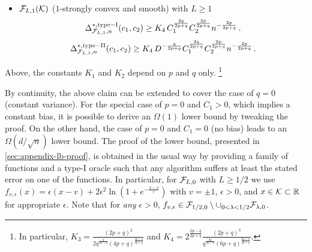 \begin{theorem}
\begin{itemize}
\item
${\mathcal{F}_{L,1}(\mathcal{K})}$ ($1$-strongly convex and smooth) with $L\ge 1$
\[
\Delta_{\F_{L,1}, n}^{*, \mathrm{type-I}}(c_1,c_2) \ge K_4 \,  C_1^{\frac{2q}{2p+q}} C_2^{\frac{2p}{2p+q}} n^{-\frac{2p}{2p+q}}\,. %
\]
\[
\Delta_{\F_{L,1}, n}^{*, \mathrm{type-II}}(c_1,c_2) \ge K_4 \,  D^{-\frac{q}{2p+q}}C_1^{\frac{2q}{2p+q}} C_2^{\frac{2p}{2p+q}} n^{-\frac{2p}{2p+q}}\,. %
\]
\end{itemize}
Above,
the constants $K_1$ and $K_2$ depend on $p$ and $q$ only.%
\footnote{
In particular,
$K_3= \frac{\left(2p+q\right)^2}{2q^{\frac{q}{2p+q}}\left(4p+q\right)^{\frac{4p+q}{2p+q}}}$
and
$K_4= 2^{\frac{2p-q}{2p+q}} \frac{(2p+q)^3}{q^{\frac{2q}{2p+q}}(6p+q)^{\frac{6p+q}{2p+q}}}$.}
\end{theorem}

By continuity, the above claim can be extended to cover the case of $q=0$ (constant variance). 
For the special case of $p=0$ and $C_1>0$, which implies a constant bias, it is possible to derive an $\Omega(1)$ lower bound by tweaking the proof. On the other hand, the case of $p=0$ and $C_1=0$ (no bias) leads to an $\Omega(d/\sqrt{n})$ lower bound. The proof of the lower bound, presented in \cref{sec:appendix-lb-proof}, is obtained in the usual way by providing a family of functions and a type-I oracle such that any algorithm suffers at least the stated error on one of the functions. In particular, for $\mathcal{F}_{L,0}$ with $L\ge 1/2$ we use
$f_{v,\epsilon}(x)=\epsilon\left( x-v\right)+2\epsilon^2 \ln\left(1+e^{-\frac{x-v}{\epsilon}}  \right)$ with $v=\pm 1$, $\epsilon>0$, and $x \in \mathcal{K} \subset \mathbb{R}$ for appropriate $\epsilon$. Note that for \emph{any} $\epsilon>0$, $f_{v,\epsilon}\in \mathcal{F}_{1/2,0}\setminus \cup_{0<\lambda<1/2} \mathcal{F}_{\lambda,0}$.


